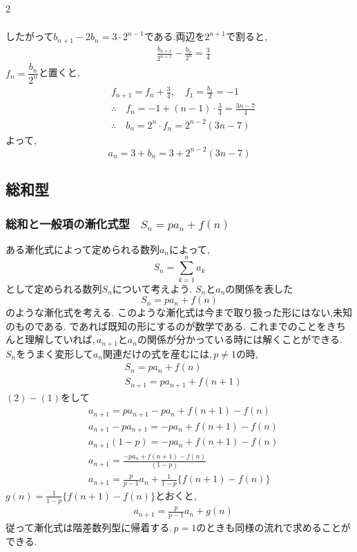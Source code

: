 \documentclass[dvipdfmx,a4paper,11pt,fleqn,openany]{jsbook}
\begin{document}
\begin{multicols*}{2}
\begin{enumerate}[label=(\arabic*),parsep=3pt]
\begin{align*}
              \end{align*}
              したがって$b_{n+1}-2b_n=3\cdot2^{n-1}$である.両辺を$2^{n+1}$で割ると,
              \begin{align*}
                &\frac{b_{n+1}}{2^{n+1}}-\frac{b_n}{2^n}=\frac34
              \end{align*}
              $f_n=\dfrac{b_n}{2^n}$と置くと,
              \begin{align*}
                &f_{n+1}=f_n+\frac34,\quad f_1=\frac{b_1}{2}=-1\\
                &\therefore \quad f_n=-1+(n-1)\cdot\frac34=\frac{3n-7}{4}\\
                &\therefore \quad b_n=2^n\cdot f_n=2^{n-2}(3n-7)
              \end{align*}
              よって,
              \[
                a_n=3+b_n=3+2^{n-2}(3n-7)
              \]
      \end{enumerate}
  \subsection{総和型}
    \subsubsection{総和と一般項の漸化式型 \, $S_n=pa_n+f(n)$}
      ある漸化式によって定められる数列$a_n$によって,
      \[
        S_n=\sum_{k=1}^{n} a_k
      \]
      として定められる数列$S_n$について考えよう.
      $S_n$と$a_n$の関係を表した
      \[
        S_n=pa_n+f(n)
      \]
      のような漸化式を考える.
      このような漸化式は今まで取り扱った形にはない,未知のものである.
      であれば既知の形にするのが数学である.
      これまでのことをきちんと理解していれば,\,$a_{n+1}$と$a_n$の関係が分かっている時には解くことができる.
      $S_n$をうまく変形して$a_{n}$関連だけの式を産むには,\,$p \neq 1$の時,
      \begin{align*}
        &S_n=pa_n+f(n) \tag*{\(\cdots\) (1)}\\
        &S_{n+1}=pa_{n+1}+f(n+1) \tag*{\(\cdots\) (2)}
      \end{align*}
      $(2)-(1)$をして
      \begin{align*}
        &a_{n+1}=pa_{n+1}-pa_n+f(n+1)-f(n)\\
        &a_{n+1}-pa_{n+1}=-pa_n+f(n+1)-f(n)\\
        &a_{n+1}(1-p)=-pa_n+f(n+1)-f(n)\\
        &a_{n+1}=\frac{-pa_n+f(n+1)-f(n)}{(1-p)}\\
        &a_{n+1}=\frac{p}{p-1}a_n+\frac{1}{1-p}\{f(n+1)-f(n)\}
      \end{align*}
      $\displaystyle g(n)=\frac{1}{1-p}\{f(n+1)-f(n)\}$とおくと,
      \begin{align*}
        &a_{n+1}=\frac{p}{p-1}a_n+g(n)
      \end{align*}
      従って漸化式は階差数列型に帰着する.\,$p=1$のときも同様の流れで求めることができる.


\end{multicols*}
\end{document}
